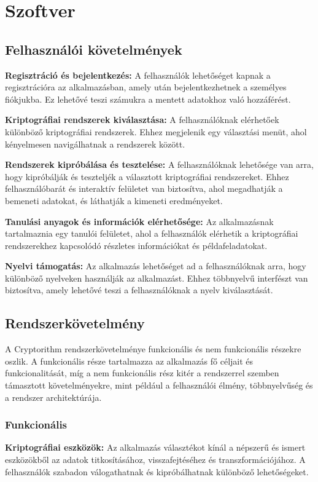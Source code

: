 \chapter{Szoftver}

\section{Felhasználói követelmények}

\textbf{Regisztráció és bejelentkezés:} A felhasználók lehetőséget kapnak a regisztrációra az alkalmazásban, amely után bejelentkezhetnek a személyes fiókjukba. Ez lehetővé teszi számukra a mentett adatokhoz való hozzáférést.

\textbf{Kriptográfiai rendszerek kiválasztása:} A felhasználóknak elérhetőek különböző kriptográfiai rendszerek. Ehhez megjelenik egy választási menüt, ahol kényelmesen navigálhatnak a rendszerek között.

\textbf{Rendszerek kipróbálása és tesztelése:} A felhasználóknak lehetősége van arra, hogy kipróbálják és teszteljék a választott kriptográfiai rendszereket. Ehhez felhasználóbarát és interaktív felületet van biztosítva, ahol megadhatják a bemeneti adatokat, és láthatják a kimeneti eredményeket.

\textbf{Tanulási anyagok és információk elérhetősége:} Az alkalmazásnak tartalmaznia egy tanulói felületet, ahol a felhasználók elérhetik a kriptográfiai rendszerekhez kapcsolódó részletes információkat és példafeladatokat.

\textbf{Nyelvi támogatás:} Az alkalmazás lehetőséget ad a felhasználóknak arra, hogy különböző nyelveken használják az alkalmazást. Ehhez többnyelvű interfészt van biztosítva, amely lehetővé teszi a felhasználóknak a nyelv kiválasztását.

\section{Rendszerkövetelmény}
A Cryptorithm rendszerkövetelménye funkcionális és nem funkcionális részekre oszlik. A funkcionális része tartalmazza az alkalmazás fő céljait és funkcionalitását, míg a nem funkcionális rész kitér a rendszerrel szemben támasztott követelményekre, mint például a felhasználói élmény, többnyelvűség és a rendszer architektúrája.

\subsection{Funkcionális}
\textbf{Kriptográfiai eszközök:} Az alkalmazás választékot kínál a népszerű és ismert eszközökből az adatok titkosításához, visszafejtéséhez és transzformációjához. A felhasználók szabadon válogathatnak és kipróbálhatnak különböző lehetőségeket.

